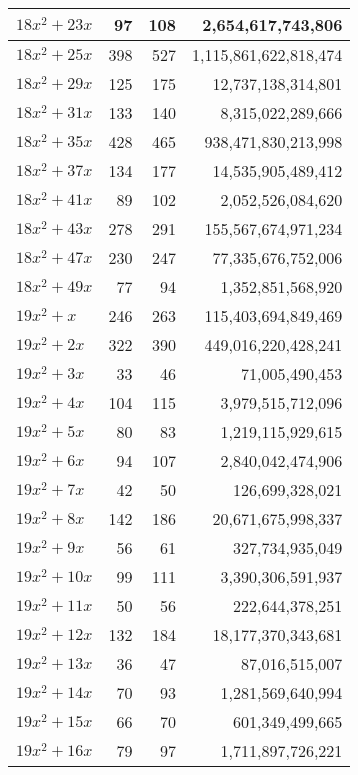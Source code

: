 \documentclass[a4paper]{amsproc}
\theoremstyle{plain}
\begin{document}
\begin{longtable}{ | l | r | r | r | }
$18x^2 + 23x$ & 97 & 108 & 2{,}654{,}617{,}743{,}806 \\ \hline
$18x^2 + 25x$ & 398 & 527 & 1{,}115{,}861{,}622{,}818{,}474 \\ \hline
$18x^2 + 29x$ & 125 & 175 & 12{,}737{,}138{,}314{,}801 \\ \hline
$18x^2 + 31x$ & 133 & 140 & 8{,}315{,}022{,}289{,}666 \\ \hline
$18x^2 + 35x$ & 428 & 465 & 938{,}471{,}830{,}213{,}998 \\ \hline
$18x^2 + 37x$ & 134 & 177 & 14{,}535{,}905{,}489{,}412 \\ \hline
$18x^2 + 41x$ & 89 & 102 & 2{,}052{,}526{,}084{,}620 \\ \hline
$18x^2 + 43x$ & 278 & 291 & 155{,}567{,}674{,}971{,}234 \\ \hline
$18x^2 + 47x$ & 230 & 247 & 77{,}335{,}676{,}752{,}006 \\ \hline
$18x^2 + 49x$ & 77 & 94 & 1{,}352{,}851{,}568{,}920 \\ \hline
$19x^2 + x$ & 246 & 263 & 115{,}403{,}694{,}849{,}469 \\ \hline
$19x^2 + 2x$ & 322 & 390 & 449{,}016{,}220{,}428{,}241 \\ \hline
$19x^2 + 3x$ & 33 & 46 & 71{,}005{,}490{,}453 \\ \hline
$19x^2 + 4x$ & 104 & 115 & 3{,}979{,}515{,}712{,}096 \\ \hline
$19x^2 + 5x$ & 80 & 83 & 1{,}219{,}115{,}929{,}615 \\ \hline
$19x^2 + 6x$ & 94 & 107 & 2{,}840{,}042{,}474{,}906 \\ \hline
$19x^2 + 7x$ & 42 & 50 & 126{,}699{,}328{,}021 \\ \hline
$19x^2 + 8x$ & 142 & 186 & 20{,}671{,}675{,}998{,}337 \\ \hline
$19x^2 + 9x$ & 56 & 61 & 327{,}734{,}935{,}049 \\ \hline
$19x^2 + 10x$ & 99 & 111 & 3{,}390{,}306{,}591{,}937 \\ \hline
$19x^2 + 11x$ & 50 & 56 & 222{,}644{,}378{,}251 \\ \hline
$19x^2 + 12x$ & 132 & 184 & 18{,}177{,}370{,}343{,}681 \\ \hline
$19x^2 + 13x$ & 36 & 47 & 87{,}016{,}515{,}007 \\ \hline
$19x^2 + 14x$ & 70 & 93 & 1{,}281{,}569{,}640{,}994 \\ \hline
$19x^2 + 15x$ & 66 & 70 & 601{,}349{,}499{,}665 \\ \hline
$19x^2 + 16x$ & 79 & 97 & 1{,}711{,}897{,}726{,}221 \\ \hline

\end{longtable}
\end{document}
